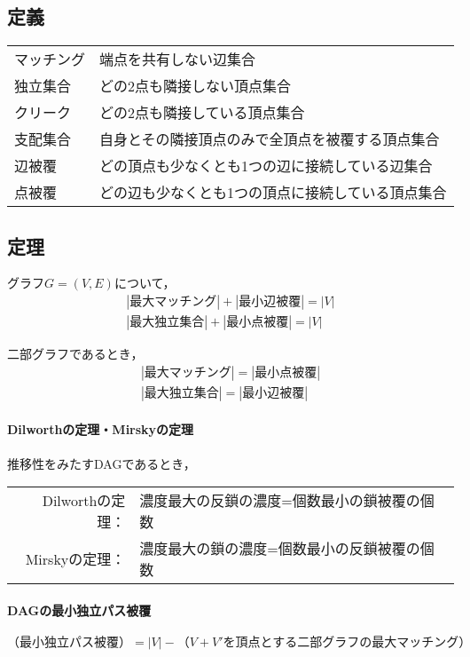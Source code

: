 \documentclass[landscape,twocolumn,9pt]{jsarticle}
\begin{document}
\subsection{定義}
\begin{table}[h]
\begin{tabular}{ll}
マッチング &端点を共有しない辺集合 \\
独立集合   &どの2点も隣接しない頂点集合 \\
クリーク   &どの2点も隣接している頂点集合 \\
支配集合   &自身とその隣接頂点のみで全頂点を被覆する頂点集合 \\
辺被覆     &どの頂点も少なくとも1つの辺に接続している辺集合 \\
点被覆     &どの辺も少なくとも1つの頂点に接続している頂点集合 \\
\end{tabular}
\end{table}

\subsection{定理}
グラフ$G=(V,E)$について，
\begin{align*}
|最大マッチング|+|最小辺被覆|=|V| \\
  |最大独立集合|+|最小点被覆|=|V|
\end{align*}

二部グラフであるとき，
\begin{align*}
|最大マッチング|=|最小点被覆| \\
  |最大独立集合|=|最小辺被覆|
\end{align*}

\paragraph{Dilworthの定理・Mirskyの定理\\}\indent
推移性をみたすDAGであるとき，
\begin{center}\tabcolsep=0mm
\begin{tabular}{rl}
Dilworthの定理： &濃度最大の反鎖の濃度=個数最小の鎖被覆の個数 \\
Mirskyの定理：   &濃度最大の鎖の濃度=個数最小の反鎖被覆の個数
\end{tabular}
\end{center}

\paragraph{DAGの最小独立パス被覆}
\[ \text{（最小独立パス被覆）}=|V|-\text{（$V+V'$を頂点とする二部グラフの最大マッチング）} \]
\end{document}
